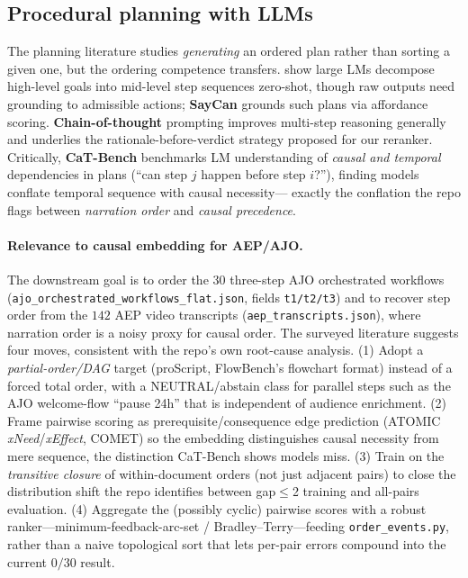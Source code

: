 \subsection{Procedural planning with LLMs}

The planning literature studies \emph{generating} an ordered plan rather than
sorting a given one, but the ordering competence transfers.
\citet{proc:huang2022zeroshotplanners} show large LMs decompose high-level
goals into mid-level step sequences zero-shot, though raw outputs need grounding
to admissible actions; \textbf{SayCan} \citep{proc:ahn2022saycan} grounds such
plans via affordance scoring. \textbf{Chain-of-thought} prompting
\citep{proc:wei2022cot} improves multi-step reasoning generally and underlies
the rationale-before-verdict strategy proposed for our reranker. Critically,
\textbf{CaT-Bench} \citep{proc:lyu2024catbench} benchmarks LM understanding of
\emph{causal and temporal} dependencies in plans (``can step $j$ happen before
step $i$?''), finding models conflate temporal sequence with causal necessity---
exactly the conflation the repo flags between \emph{narration order} and
\emph{causal precedence}.

\paragraph{Relevance to causal embedding for AEP/AJO.}
The downstream goal is to order the $30$ three-step AJO orchestrated workflows
(\texttt{ajo\_orchestrated\_workflows\_flat.json}, fields \texttt{t1/t2/t3}) and
to recover step order from the $142$ AEP video transcripts
(\texttt{aep\_transcripts.json}), where narration order is a noisy proxy for
causal order. The surveyed literature suggests four moves, consistent with the
repo's own root-cause analysis. (1) Adopt a \emph{partial-order/DAG} target
(proScript, FlowBench's flowchart format) instead of a forced total order, with
a NEUTRAL/abstain class for parallel steps such as the AJO welcome-flow ``pause
24h'' that is independent of audience enrichment. (2) Frame pairwise scoring as
prerequisite/consequence edge prediction (ATOMIC \emph{xNeed}/\emph{xEffect},
COMET) so the embedding distinguishes causal necessity from mere sequence, the
distinction CaT-Bench shows models miss. (3) Train on the \emph{transitive
closure} of within-document orders (not just adjacent pairs) to close the
distribution shift the repo identifies between gap$\le$2 training and
all-pairs evaluation. (4) Aggregate the (possibly cyclic) pairwise scores with a
robust ranker---minimum-feedback-arc-set / Bradley--Terry---feeding
\texttt{order\_events.py}, rather than a naive topological sort that lets per-pair
errors compound into the current $0/30$ result.

